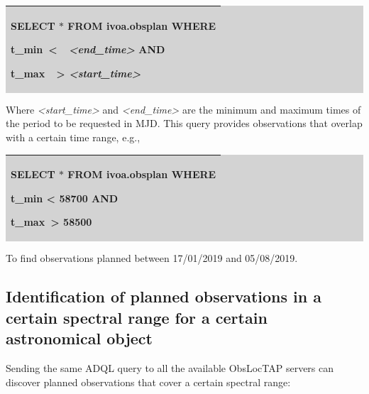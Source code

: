 \documentclass[11pt,a4paper]{ivoa}
\begin{document}
\bigskip
\par
\begingroup\setlength{\fboxsep}{0pt}
\colorbox{lightgray}{%
\begin{tabular}{|p{5.53in}|}
\hline
SELECT $\ast$  FROM ivoa.obsplan WHERE  \par  t\_min\  <\ \  \textit{<end\_time>} AND \par  t\_max\ \ >  \textit{<start\_time>} \\
\hline
\end{tabular}%
}\endgroup
\par
\bigskip
Where \textit{<start\_time>} and \textit{<end\_time> }are the minimum and maximum times of the period to be requested in MJD. This query provides observations that overlap with a certain time range, e.g.,

\bigskip
\par
\begingroup\setlength{\fboxsep}{0pt}
\colorbox{lightgray}{%
\begin{tabular}{|p{5.53in}|}
\hline
SELECT $\ast$  FROM ivoa.obsplan WHERE  \par  t\_min < 58700 AND  \par  t\_max\  > 58500 \\
\hline
\end{tabular}%
}\endgroup
\par
\bigskip

To find observations planned between 17/01/2019 and 05/08/2019.

\subsection{Identification of planned observations in a certain spectral range for a certain astronomical object}
Sending the same ADQL query to all the available ObsLocTAP servers can discover planned observations that cover a certain spectral range:
\end{document}

